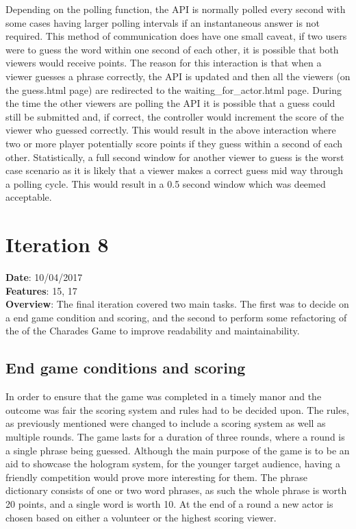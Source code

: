 Depending on the polling function, the API is normally polled every second with some cases having larger polling intervals if  an instantaneous answer is not required. This method of communication does have one small caveat, if two users were to guess the word within one second of each other, it is possible that both viewers would receive points. The reason for this interaction is that when a viewer guesses a phrase correctly, the API is updated and then all the viewers (on the guess.html page) are redirected to the waiting\_for\_actor.html page. During the time the other viewers are polling the API it is possible that a guess could still be submitted and, if correct, the controller would increment the score of the viewer who guessed correctly. This would result in the above interaction where two or more player potentially score points if they guess within a second of each other. Statistically, a full second window for another viewer to guess is the worst case scenario as it is likely that a viewer makes a correct guess mid way through a polling cycle. This would result in a 0.5 second window which was deemed acceptable.

\newpage

\section{Iteration 8}
\textbf{Date}: 10/04/2017 \\
\textbf{Features}: 15, 17 \\
\textbf{Overview}: The final iteration covered two main tasks. The first was to decide on a end game condition and scoring, and the second to perform some refactoring of the of the Charades Game to improve readability and maintainability.

\subsection{End game conditions and scoring}
In order to ensure that the game was completed in a timely manor and the outcome was fair the scoring system and rules had to be decided upon. The rules, as previously mentioned were changed to include a scoring system as well as multiple rounds. The game lasts for a duration of three rounds, where a round is a single phrase being guessed. Although the main purpose of the game is to be an aid to showcase the hologram system, for the younger target audience, having a friendly competition would prove more interesting for them. The phrase dictionary consists of one or two word phrases, as such the whole phrase is worth 20 points, and a single word is worth 10. At the end of a round a new actor is chosen based on either a volunteer or the highest scoring viewer.

